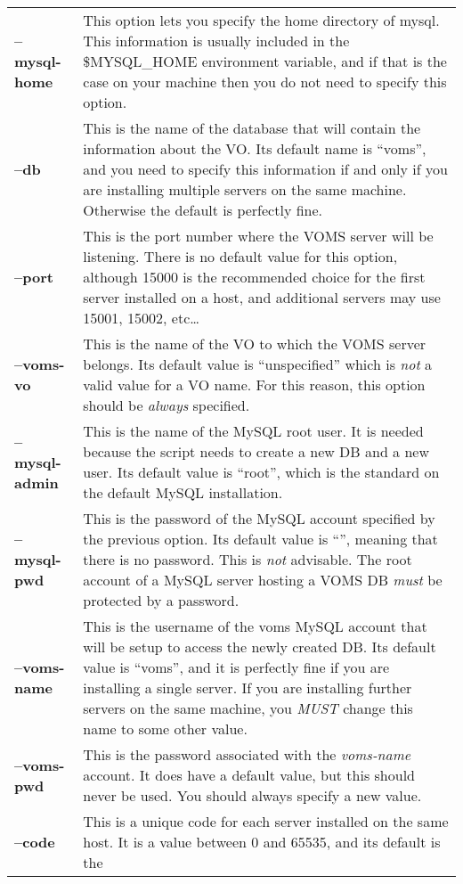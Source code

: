 \documentclass[a4paper]{book}
\begin{document}
\begin{longtable}{lp{3in}}
\textbf{--mysql-home} & This option lets you specify the home
directory of mysql.  This information is usually included in the
\$MYSQL\_HOME environment variable, and if that is the case on your
machine then you do not need to specify this option.\\
\textbf{--db} & This is the name of the database that will contain
the information about the VO.  Its default name is ``voms'', and you
need to specify this information if and only if you are installing
multiple servers on the same machine.  Otherwise the default is
perfectly fine.\\
\textbf{--port} & This is the port number where the VOMS server will
be listening.  There is no default value for this option, although
15000 is the recommended choice for the first server installed on a
host, and additional servers may use 15001, 15002, etc\ldots\\
\textbf{--voms-vo} & This is the name of the VO to which the VOMS
server belongs.  Its default value is ``unspecified'' which is
\emph{not} a valid value for a VO name.  For this reason, this option
should be \emph{always} specified.\\
\textbf{--mysql-admin} & This is the name of the MySQL root user.  It is
needed because the script needs to create a new DB and a new user. Its
default value is ``root'', which is the standard on the default MySQL
installation.\\
\textbf{--mysql-pwd} & This is the password of the MySQL account
specified by the previous option.  Its default value is ``'', meaning
that there is no password.  This is \emph{not} advisable.  The root
account of a MySQL server hosting a VOMS DB \emph{must} be protected
by a password.\\
\textbf{--voms-name} & This is the username of the voms MySQL account
that will be setup to access the newly created DB.  Its default value
is ``voms'', and it is perfectly fine if you are installing a single
server.  If you are installing further servers on the same machine, you
\emph{MUST} change this name to some other value.\\
\textbf{--voms-pwd} & This is the password associated with the
\emph{voms-name} account.  It does have a default value, but this
should never be used.  You should always specify a new value.\\
\textbf{--code} & This is a unique code for each server installed on the
same host. It is a value between 0 and 65535, and its default is the

\end{longtable}
\end{document}
